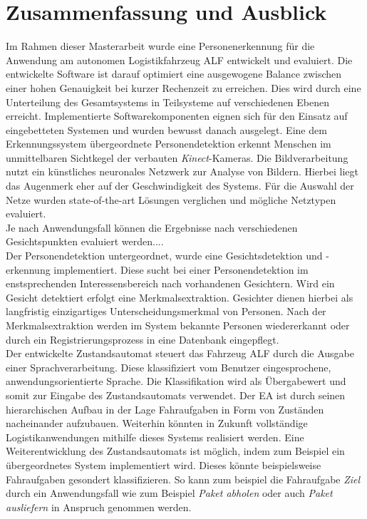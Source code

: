 \chapter{Zusammenfassung und Ausblick}
\label{Fazit und Ausblick}
	
Im Rahmen dieser Masterarbeit wurde eine Personenerkennung für die Anwendung am autonomen Logistikfahrzeug ALF entwickelt und evaluiert. Die entwickelte Software ist darauf optimiert eine ausgewogene Balance zwischen einer hohen Genauigkeit bei kurzer Rechenzeit zu erreichen. Dies wird durch eine Unterteilung des Gesamtsystems in Teilsysteme auf verschiedenen Ebenen erreicht. Implementierte Softwarekomponenten eignen sich für den Einsatz auf eingebetteten Systemen und wurden bewusst danach ausgelegt. Eine dem Erkennungssystem übergeordnete Personendetektion erkennt Menschen im unmittelbaren Sichtkegel der verbauten \textit{Kinect}-Kameras. Die Bildverarbeitung nutzt ein künstliches neuronales Netzwerk zur Analyse von Bildern. Hierbei liegt das Augenmerk eher auf der Geschwindigkeit des Systems. Für die Auswahl der Netze wurden state-of-the-art Lösungen verglichen und mögliche Netztypen evaluiert.\\

Je nach Anwendungsfall können die Ergebnisse nach verschiedenen Gesichtspunkten evaluiert werden....\\

Der Personendetektion untergeordnet, wurde eine Gesichtsdetektion und -erkennung implementiert. Diese sucht bei einer Personendetektion im enstsprechenden Interessensbereich nach vorhandenen Gesichtern. Wird ein Gesicht detektiert erfolgt eine Merkmalsextraktion. Gesichter dienen hierbei als langfristig einzigartiges Unterscheidungsmerkmal von Personen. Nach der Merkmalsextraktion werden im System bekannte Personen wiedererkannt oder durch ein Registrierungsprozess in eine Datenbank eingepflegt.\\

Der entwickelte Zustandsautomat steuert das Fahrzeug ALF durch die Ausgabe einer Sprachverarbeitung. Diese klassifiziert vom Benutzer eingesprochene, anwendungsorientierte Sprache. Die Klassifikation wird als Übergabewert und somit zur Eingabe des Zustandsautomats verwendet. Der EA ist durch seinen hierarchischen Aufbau in der Lage Fahraufgaben in Form von Zuständen nacheinander aufzubauen. Weiterhin könnten in Zukunft vollständige Logistikanwendungen mithilfe dieses Systems realisiert werden. Eine Weiterentwicklung des Zustandsautomats ist möglich, indem zum Beispiel ein übergeordnetes System implementiert wird. Dieses könnte beispielsweise Fahraufgaben gesondert klassifizieren. So kann zum beispiel die Fahraufgabe \textit{Ziel} durch ein Anwendungsfall wie zum Beispiel \textit{Paket abholen} oder auch \textit{Paket ausliefern} in Anspruch genommen werden.\\


